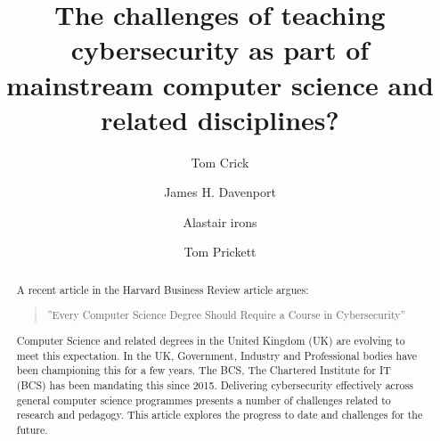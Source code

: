 \documentclass[sigconf]{acmart}
\begin{document}
\title{The challenges of teaching cybersecurity as part of mainstream computer science and related disciplines?}




\author{Tom Crick}


\author{James H. Davenport}

\author{Alastair irons}

\author{Tom Prickett}


\renewcommand{\shortauthors}{Crick, Davenport,  Irons, and Prickett.}
\begin{abstract}
  A recent article in the Harvard Business Review article argues:
  \begin{quote}
      ''Every Computer Science Degree Should Require a Course in Cybersecurity''\cite{cable_2019}
  \end{quote}
   Computer Science and related degrees in the United Kingdom (UK) are evolving to meet this expectation. In the UK, Government, Industry and Professional bodies have been championing this for a few years. The BCS, The Chartered Institute for IT (BCS) has been mandating this since 2015\cite{Cricketal2019}. Delivering cybersecurity effectively across general computer science programmes presents a number of challenges related to research and pedagogy. This article explores the progress to date and challenges for the future.
   
\end{abstract}
\end{document}
